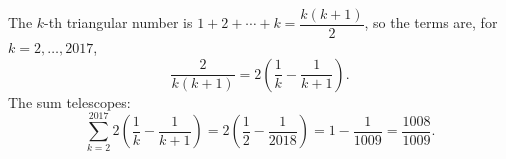 The $k$-th triangular number is $1+2+\cdots+k=\dfrac{k(k+1)}{2}$, so the terms are, for $k=2,\dots,2017$,
\[
\dfrac{2}{k(k+1)}=2\left(\dfrac{1}{k}-\dfrac{1}{k+1}\right).
\]
The sum telescopes:
\[
\sum_{k=2}^{2017}2\left(\dfrac{1}{k}-\dfrac{1}{k+1}\right)=2\left(\dfrac{1}{2}-\dfrac{1}{2018}\right)=1-\dfrac{1}{1009}=\boxed{\dfrac{1008}{1009}}.
\]
